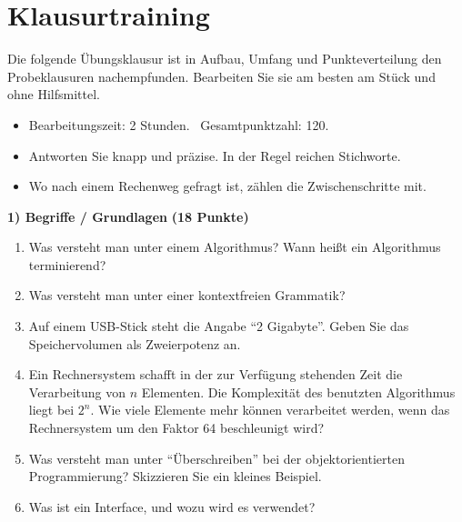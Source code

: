 \newpage
{}
\section{Klausurtraining}
Die folgende Übungsklausur ist in Aufbau, Umfang und Punkteverteilung den Probeklausuren nachempfunden. Bearbeiten Sie sie am besten am Stück und ohne Hilfsmittel.

\begin{merke}[Hinweise]
\begin{itemize}[itemsep=0.1em]
\item Bearbeitungszeit: 2 Stunden. \ Gesamtpunktzahl: 120.
\item Antworten Sie knapp und präzise. In der Regel reichen Stichworte.
\item Wo nach einem Rechenweg gefragt ist, zählen die Zwischenschritte mit.
\end{itemize}
\end{merke}

\newcommand{\klausuraufgabe}[2]{\par\bigskip\needspace{5\baselineskip}\noindent\textbf{\large #1} \textcolor{diagramm}{\textbf{(#2 Punkte)}}\par\nopagebreak\smallskip}

\klausuraufgabe{1) Begriffe / Grundlagen}{18}
\begin{enumerate}[label=\alph*)]
\item Was versteht man unter einem Algorithmus? Wann heißt ein Algorithmus terminierend?
\item Was versteht man unter einer kontextfreien Grammatik?
\item Auf einem USB-Stick steht die Angabe \enquote{2 Gigabyte}. Geben Sie das Speichervolumen als Zweierpotenz an.
\item Ein Rechnersystem schafft in der zur Verfügung stehenden Zeit die Verarbeitung von $n$ Elementen. Die Komplexität des benutzten Algorithmus liegt bei $2^n$. Wie viele Elemente mehr können verarbeitet werden, wenn das Rechnersystem um den Faktor 64 beschleunigt wird?
\item Was versteht man unter \enquote{Überschreiben} bei der objektorientierten Programmierung? Skizzieren Sie ein kleines Beispiel.
\item Was ist ein Interface, und wozu wird es verwendet?
\end{enumerate}

